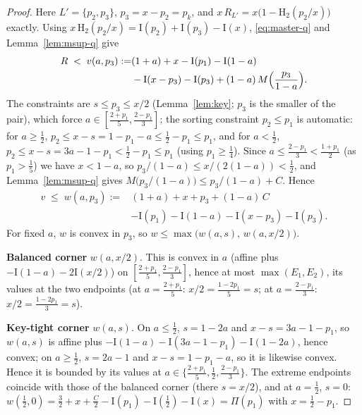 \documentclass[journal]{IEEEtran}
\theoremstyle{definition}
\newcommand{\Hh}{\mathrm H_2}
\newcommand{\CC}{C}
\begin{document}
\begin{proof}
Here $L'=\{p_2,p_3\}$, $p_3=x-p_2=p_k$, and
$x\,R_{L'}=x\bigl(1-\Hh(p_2/x)\bigr)$ exactly. Using
$x\,\Hh(p_2/x)=\mathrm I(p_2)+\mathrm I(p_3)-\mathrm I(x)$, \eqref{eq:master-q} and
Lemma~\ref{lem:msup-q} give
\[
\begin{aligned}
  R\;<\;v(a,p_3):=&(1+a)+x-\mathrm I(p_1)-\mathrm I(1-a)\\
  &-\mathrm I(x-p_3)-\mathrm I(p_3)
  +(1-a)\,M\Bigl(\frac{p_3}{1-a}\Bigr).
\end{aligned}
\]
The constraints are $s\le p_3\le x/2$ \textup{(}Lemma~\ref{lem:key};
$p_3$ is the smaller of the pair\textup{)}, which force
$a\in[\tfrac{2+p_1}5,\tfrac{2-p_1}3]$; the sorting constraint
$p_2\le p_1$ is automatic: for $a\ge\tfrac12$,
$p_2\le x-s=1-p_1-a\le\tfrac12-p_1\le p_1$, and for $a<\tfrac12$,
$p_2\le x-s=3a-1-p_1<\tfrac12-p_1\le p_1$ \textup{(}using
$p_1\ge\tfrac14$\textup{)}. Since
$a\le\tfrac{2-p_1}3<\tfrac{1+p_1}2$ \textup{(}as $p_1>\tfrac15$\textup{)}
we have $x<1-a$, so $p_3/(1-a)\le x/(2(1-a))<\tfrac12$, and
Lemma~\ref{lem:msup-q} gives $M\bigl(p_3/(1-a)\bigr)\le p_3/(1-a)+\CC$.
Hence
\[
\begin{aligned}
  v\;\le\;w(a,p_3):=&(1+a)+x+p_3+(1-a)\,\CC\\
  &-\mathrm I(p_1)-\mathrm I(1-a)-\mathrm I(x-p_3)-\mathrm I(p_3).
\end{aligned}
\]
For fixed $a$, $w$ is convex in $p_3$, so
$w\le\max\bigl(w(a,s),\,w(a,x/2)\bigr)$.

\textbf{Balanced corner} $w(a,x/2)$. This is convex in $a$ \textup{(}affine plus
$-\mathrm I(1-a)-2\mathrm I(x/2)$\textup{)} on $[\tfrac{2+p_1}5,\tfrac{2-p_1}3]$,
hence at most $\max(E_1,E_2)$, its values at the two endpoints
\textup{(}at $a=\tfrac{2+p_1}5$: $x/2=\tfrac{1-2p_1}5=s$; at
$a=\tfrac{2-p_1}3$: $x/2=\tfrac{1-2p_1}3=s$\textup{)}.

\textbf{Key-tight corner} $w(a,s)$. On $a\le\tfrac12$, $s=1-2a$ and
$x-s=3a-1-p_1$, so $w(a,s)$ is affine plus
$-\mathrm I(1-a)-\mathrm I(3a-1-p_1)-\mathrm I(1-2a)$, hence convex; on
$a\ge\tfrac12$, $s=2a-1$ and $x-s=1-p_1-a$, so it is likewise convex. Hence it
is bounded by its
values at $a\in\{\tfrac{2+p_1}5,\tfrac12,\tfrac{2-p_1}3\}$. The extreme
endpoints coincide with those of the balanced corner \textup{(}there
$s=x/2$\textup{)}, and at $a=\tfrac12$, $s=0$:
$w(\tfrac12,0)=\tfrac32+x+\tfrac{\CC}2-\mathrm I(p_1)-\mathrm I(\tfrac12)-\mathrm I(x)
=\Pi(p_1)$ with $x=\tfrac12-p_1$.
\end{proof}
\end{document}

